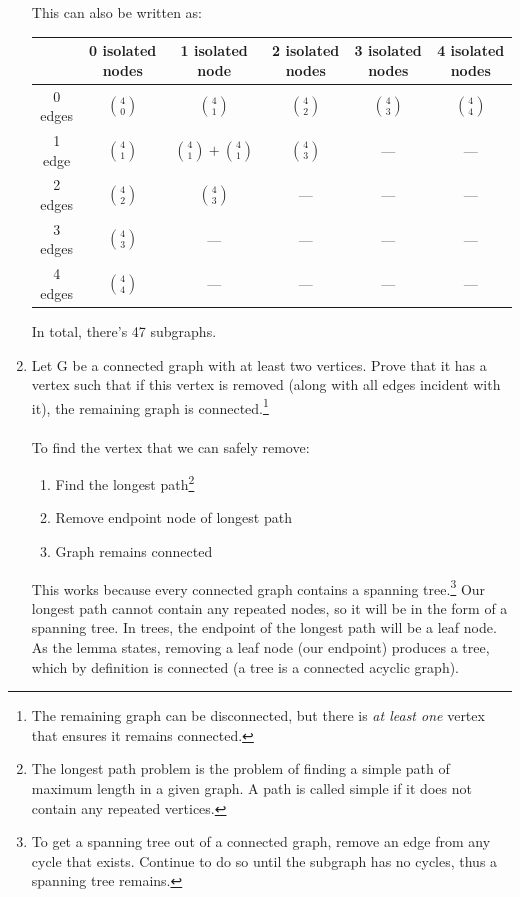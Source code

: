 \documentclass[10pt,a4paper,final]{article}
\begin{document}
\begin{enumerate}
This can also be written as:

\begin{tabular}{|c||c|c|c|c|c|}
\hline 
 & 0 isolated nodes & 1 isolated node & 2 isolated nodes & 3 isolated nodes & 4 isolated nodes \\ 
\hline \hline 
0 edges & $4 \choose 0$ & $4 \choose 1$ & $4 \choose 2$ & $4 \choose 3$ & $4 \choose 4$ \\ 
\hline 
1 edge &  $4 \choose 1$ & $\binom{4}{1} + \binom{4}{1}$ & $4 \choose 3$ & --- & --- \\ 
\hline 
2 edges &  $4 \choose 2$ & $4 \choose 3$ & --- & --- & --- \\ 
\hline 
3 edges &  $4 \choose 3$ & --- & --- & --- & --- \\ 
\hline 
4 edges &  $4 \choose 4$ & --- & --- & --- & --- \\ 
\hline 
\end{tabular} 

In total, there's 47 subgraphs.

\item %
Let G be a connected graph with at least two vertices. Prove that it has a vertex such that if this vertex is removed (along with all edges incident with it), the remaining graph is connected.\footnote{
The remaining graph can be disconnected, but there is \emph{at least one} vertex that ensures it remains connected.} \\
\\
To find the vertex that we can safely remove:
\begin{enumerate}
  \item Find the longest path\footnote{The longest path problem is the problem of finding a simple path of maximum length in a given graph. A path is called simple if it does not contain any repeated vertices.}
  \item Remove endpoint node of longest path
  \item Graph remains connected
\end{enumerate}

This works because every connected graph contains a spanning tree.\footnote{To get a spanning tree out of a connected graph, remove an edge from any cycle that exists. Continue to do so until the subgraph has no cycles, thus a spanning tree remains.}
Our longest path cannot contain any repeated nodes, so it will be in the form of a spanning tree.
In trees, the endpoint of the longest path will be a leaf node.
As the lemma states, removing a leaf node (our endpoint) produces a tree,
which by definition is connected (a tree is a connected acyclic graph).


\end{enumerate}
\end{document}
